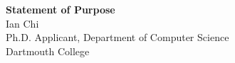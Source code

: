 \documentclass[11pt]{article}
\begin{document}
\begin{center}
    {\Large \textbf{Statement of Purpose}}\\[4pt]
    {\large Ian Chi}\\[2pt]
    Ph.D. Applicant, Department of Computer Science\\
    Dartmouth College
\end{center}

\vspace{1em}

\end{document}
